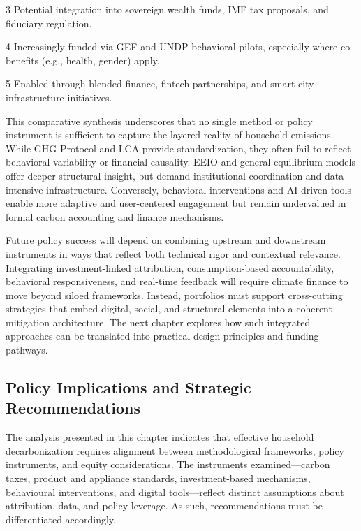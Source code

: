 \documentclass[12pt,a4paper]{article}%
\begin{document}
\begin{table}[h]
\begin{threeparttable}
\begin{tablenotes}
\item[3] Potential integration into sovereign wealth funds, IMF tax proposals, and fiduciary regulation.
\item[4] Increasingly funded via GEF and UNDP behavioral pilots, especially where co-benefits (e.g., health, gender) apply.
\item[5] Enabled through blended finance, fintech partnerships, and smart city infrastructure initiatives.
\end{tablenotes}
\end{threeparttable}
\end{table}

This comparative synthesis underscores that no single method or policy instrument is sufficient to capture the layered reality of household emissions. While GHG Protocol and LCA provide standardization, they often fail to reflect behavioral variability or financial causality. EEIO and general equilibrium models offer deeper structural insight, but demand institutional coordination and data-intensive infrastructure. Conversely, behavioral interventions and AI-driven tools enable more adaptive and user-centered engagement but remain undervalued in formal carbon accounting and finance mechanisms.

Future policy success will depend on combining upstream and downstream instruments in ways that reflect both technical rigor and contextual relevance. Integrating investment-linked attribution, consumption-based accountability, behavioral responsiveness, and real-time feedback will require climate finance to move beyond siloed frameworks. Instead, portfolios must support cross-cutting strategies that embed digital, social, and structural elements into a coherent mitigation architecture. The next chapter explores how such integrated approaches can be translated into practical design principles and funding pathways.

\subsection{Policy Implications and Strategic Recommendations}

The analysis presented in this chapter indicates that effective household decarbonization requires alignment between methodological frameworks, policy instruments, and equity considerations. The instruments examined—carbon taxes, product and appliance standards, investment-based mechanisms, behavioural interventions, and digital tools—reflect distinct assumptions about attribution, data, and policy leverage. As such, recommendations must be differentiated accordingly.
\end{document}
